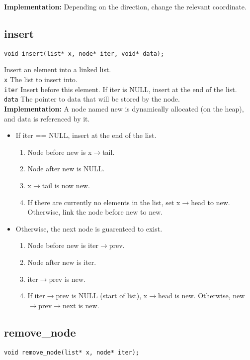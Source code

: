 \documentclass{article}
\begin{document}
 
 \textbf{Implementation:}
Depending on the direction, change the relevant coordinate.


\subsection{insert}
\begin{lstlisting}
void insert(list* x, node* iter, void* data);
\end{lstlisting}


  Insert an element into a linked list.\\ 
 \texttt{x} The list to insert into.\\ 
 \texttt{iter} Insert before this element. If  iter is NULL,
     insert at the end of the list.\\ 
 \texttt{data} The pointer to data that will be stored by the node.\\ 
 
 
 \textbf{Implementation:}
 A node named new is dynamically allocated (on the heap),
     and  data is referenced by it.
     \begin{itemize}
 \item If  iter == NULL, insert at the end of the list.
    \begin{enumerate}
     \item Node before new is  x$\rightarrow$tail.
     \item Node after new is NULL.
     \item  x$\rightarrow$tail is now new.
     \item If there are currently no elements in the list,
             set x$\rightarrow$head to new. Otherwise, link the node before
             new to new.
    \end{enumerate}
 \item Otherwise, the next node is guarenteed to exist.
    \begin{enumerate}
     \item Node before new is  iter$\rightarrow$prev.
     \item Node after new is iter.
     \item  iter$\rightarrow$prev is new.
     \item If iter$\rightarrow$prev is NULL (start of list),  x$\rightarrow$head is new.
         Otherwise, new$\rightarrow$prev$\rightarrow$next is new.
    \end{enumerate}
 \end{itemize}

\subsection{remove\_node}
\begin{lstlisting}
void remove_node(list* x, node* iter);
\end{lstlisting}
\end{document}
